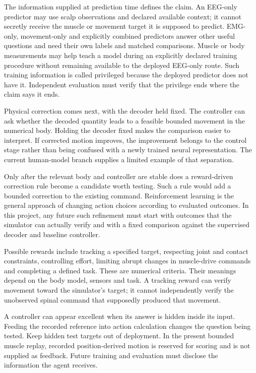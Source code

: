 The information supplied at prediction time defines the claim. An EEG-only
predictor may use scalp observations and declared available context; it cannot
secretly receive the muscle or movement target it is supposed to predict.
EMG-only, movement-only and explicitly combined predictors answer other useful
questions and need their own labels and matched comparisons. Muscle or body
measurements may help teach a model during an explicitly declared training
procedure without remaining available to the deployed EEG-only route. Such
training information is called privileged because the deployed predictor does
not have it. Independent evaluation must verify that the privilege ends where
the claim says it ends.

Physical correction comes next, with the decoder held fixed. The controller can ask whether the decoded quantity leads to a feasible bounded movement in the numerical body. Holding the decoder fixed makes the comparison easier to interpret. If corrected motion improves, the improvement belongs to the control stage rather than being confused with a newly trained neural representation. The current human-model branch supplies a limited example of that separation.

Only after the relevant body and controller are stable does a reward-driven correction rule become a candidate worth testing. Such a rule would add a bounded correction to the existing command. Reinforcement learning is the general approach of changing action choices according to evaluated outcomes. In this project, any future such refinement must start with outcomes that the simulator can actually verify and with a fixed comparison against the supervised decoder and baseline controller.

Possible rewards include tracking a specified target, respecting joint and contact constraints, controlling effort, limiting abrupt changes in muscle-drive commands and completing a defined task. These are numerical criteria. Their meanings depend on the body model, sensors and task. A tracking reward can verify movement toward the simulator's target; it cannot independently verify the unobserved spinal command that supposedly produced that movement.

A controller can appear excellent when its answer is hidden inside its input. Feeding the recorded reference into action calculation changes the question being tested. Keep hidden test targets out of deployment. In the present bounded muscle replay, recorded position-derived motion is reserved for scoring and is not supplied as feedback. Future training and evaluation must disclose the information the agent receives.

